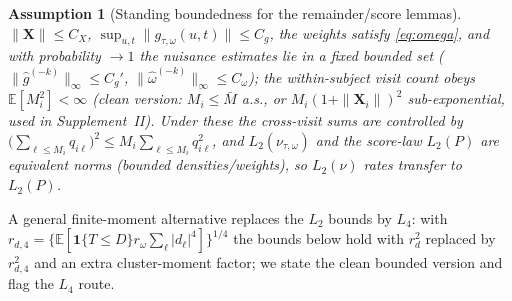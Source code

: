 \documentclass[11pt]{article}
\newtheorem{assumption}{Assumption}
\theoremstyle{remark}\newtheorem{remark}{Remark}
\newcommand{\E}{\mathbb{E}}
\newcommand{\X}{\bm{X}}
\newcommand{\indc}[1]{\mathbf{1}\{#1\}}
\begin{document}
\begin{assumption}[Standing boundedness for the remainder/score lemmas]\label{as:bdd}
$\|\X\|\le C_X$, $\sup_{u,t}\|g_{\tau,\omega}(u,t)\|\le C_g$, the weights satisfy
\eqref{eq:omega}, and with probability $\to1$ the nuisance estimates lie in a
fixed bounded set ($\|\widehat g^{(-k)}\|_\infty\le C_g'$,
$\|\widehat\omega^{(-k)}\|_\infty\le C_\omega$); the within-subject visit count
obeys $\E[M_i^{2}]<\infty$ (clean version: $M_i\le \bar M$ a.s., or
$M_i(1+\|\X_i\|)^2$ sub-exponential, used in Supplement~II). Under these the
cross-visit sums are controlled by $\big(\sum_{\ell\le M_i}q_{i\ell}\big)^2\le
M_i\sum_{\ell\le M_i}q_{i\ell}^2$, and $L_2(\nu_{\tau,\omega})$ and the score-law
$L_2(P)$ are equivalent norms (bounded densities/weights), so $L_2(\nu)$ rates
transfer to $L_2(P)$.
\end{assumption}
\noindent A general finite-moment alternative replaces the $L_2$ bounds by $L_4$:
with $r_{d,4}=\{\E[\indc{T\le D}r_\omega\sum_\ell|d_\ell|^4]\}^{1/4}$ the bounds
below hold with $r_d^2$ replaced by $r_{d,4}^2$ and an extra cluster-moment
factor; we state the clean bounded version and flag the $L_4$ route.
\end{document}
